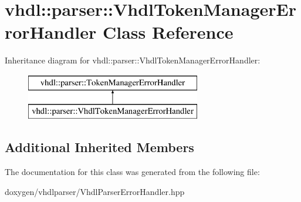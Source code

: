 \hypertarget{classvhdl_1_1parser_1_1_vhdl_token_manager_error_handler}{}\section{vhdl\+::parser\+::Vhdl\+Token\+Manager\+Error\+Handler Class Reference}
\label{classvhdl_1_1parser_1_1_vhdl_token_manager_error_handler}
Inheritance diagram for vhdl\+::parser\+::Vhdl\+Token\+Manager\+Error\+Handler\+:\begin{figure}[H]
\begin{center}
\leavevmode
\includegraphics[height=2.000000cm]{classvhdl_1_1parser_1_1_vhdl_token_manager_error_handler}
\end{center}
\end{figure}
\subsection*{Additional Inherited Members}


The documentation for this class was generated from the following file\+:\begin{DoxyCompactItemize}
\item 
doxygen/vhdlparser/Vhdl\+Parser\+Error\+Handler.\+hpp\end{DoxyCompactItemize}

